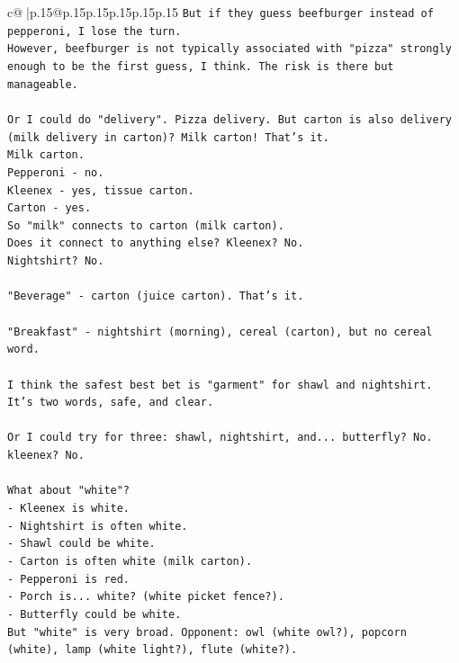 \documentclass{article}
\begin{document}
{\begin{supertabular}{c@{$\;$}|p{.15\linewidth}@{}p{.15\linewidth}p{.15\linewidth}p{.15\linewidth}p{.15\linewidth}p{.15\linewidth}}
{{{\texttt{But if they guess beefburger instead of pepperoni, I lose the turn.} \\
\texttt{However, beefburger is not typically associated with "pizza" strongly enough to be the first guess, I think. The risk is there but manageable.} \\
\\ 
\texttt{Or I could do "delivery". Pizza delivery. But carton is also delivery (milk delivery in carton)? Milk carton! That's it.} \\
\texttt{Milk carton.} \\
\texttt{Pepperoni {-} no.} \\
\texttt{Kleenex {-} yes, tissue carton.} \\
\texttt{Carton {-} yes.} \\
\texttt{So "milk" connects to carton (milk carton).} \\
\texttt{Does it connect to anything else? Kleenex? No.} \\
\texttt{Nightshirt? No.} \\
\\ 
\texttt{"Beverage" {-} carton (juice carton). That's it.} \\
\\ 
\texttt{"Breakfast" {-} nightshirt (morning), cereal (carton), but no cereal word.} \\
\\ 
\texttt{I think the safest best bet is "garment" for shawl and nightshirt. It's two words, safe, and clear.} \\
\\ 
\texttt{Or I could try for three: shawl, nightshirt, and... butterfly? No. kleenex? No.} \\
\\ 
\texttt{What about "white"? } \\
\texttt{{-} Kleenex is white.} \\
\texttt{{-} Nightshirt is often white.} \\
\texttt{{-} Shawl could be white.} \\
\texttt{{-} Carton is often white (milk carton).} \\
\texttt{{-} Pepperoni is red.} \\
\texttt{{-} Porch is... white? (white picket fence?).} \\
\texttt{{-} Butterfly could be white.} \\
\texttt{But "white" is very broad. Opponent: owl (white owl?), popcorn (white), lamp (white light?), flute (white?).} \\
}}}
\end{supertabular}}
\end{document}
